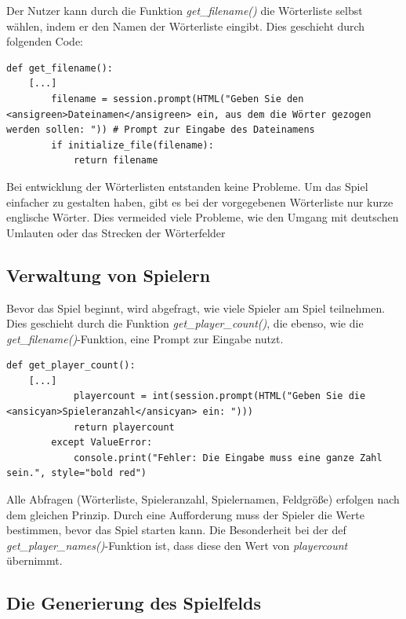\documentclass{llncs}
\begin{document}
Der Nutzer kann durch die Funktion \textit{get\_filename()} die Wörterliste selbst wählen, indem er den Namen der Wörterliste eingibt. Dies geschieht durch folgenden Code:




\begin{lstlisting}[caption=Auswahl der Wörterliste]
def get_filename():
    [...]
        filename = session.prompt(HTML("Geben Sie den <ansigreen>Dateinamen</ansigreen> ein, aus dem die Wörter gezogen werden sollen: ")) # Prompt zur Eingabe des Dateinamens
        if initialize_file(filename):
            return filename
\end{lstlisting}

Bei entwicklung der Wörterlisten entstanden keine Probleme. Um das Spiel einfacher zu gestalten haben, gibt es bei der vorgegebenen Wörterliste nur kurze englische Wörter. Dies vermeided viele Probleme, wie den Umgang mit deutschen Umlauten oder das Strecken der Wörterfelder
\subsection{Verwaltung von Spielern}

Bevor das Spiel beginnt, wird abgefragt, wie viele Spieler am Spiel teilnehmen. Dies geschieht durch die Funktion \textit{get\_player\_count()}, die ebenso, wie die \textit{get\_filename()}-Funktion, eine Prompt zur Eingabe nutzt. 

\begin{lstlisting}[caption=Spieleranzahl Bestimmung]
def get_player_count():
    [...]
            playercount = int(session.prompt(HTML("Geben Sie die <ansicyan>Spieleranzahl</ansicyan> ein: ")))
            return playercount
        except ValueError:
            console.print("Fehler: Die Eingabe muss eine ganze Zahl sein.", style="bold red")
\end{lstlisting}

Alle Abfragen (Wörterliste, Spieleranzahl, Spielernamen, Feldgröße) erfolgen nach dem gleichen Prinzip. Durch eine Aufforderung muss der Spieler die Werte bestimmen, bevor das Spiel starten kann. Die Besonderheit bei der def \textit{get\_player\_names()}-Funktion ist, dass diese den Wert von \textit{playercount} übernimmt.

\subsection{Die Generierung des Spielfelds}
\end{document}
